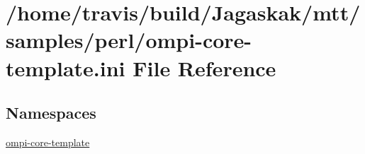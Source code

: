 \hypertarget{ompi-core-template_8ini}{\section{/home/travis/build/\-Jagaskak/mtt/samples/perl/ompi-\/core-\/template.ini File Reference}
\label{ompi-core-template_8ini}
}
\subsection*{Namespaces}
\begin{DoxyCompactItemize}
\item 
\hyperlink{namespaceompi-core-template}{ompi-\/core-\/template}
\end{DoxyCompactItemize}
